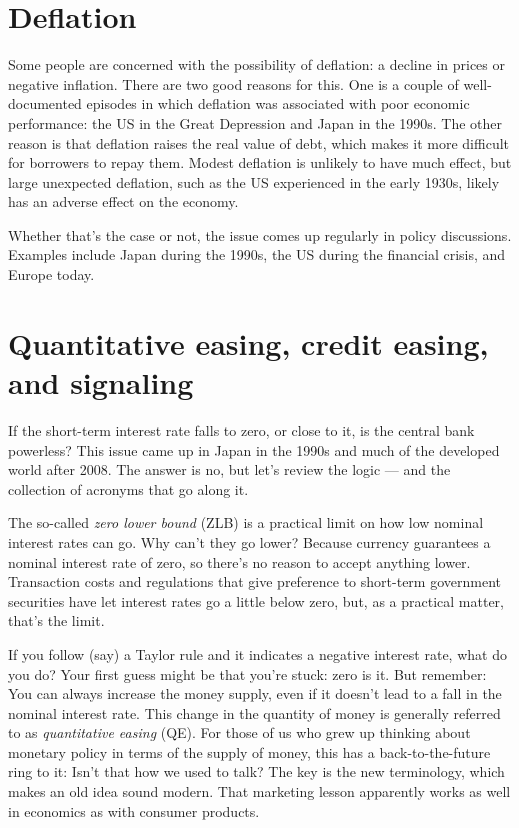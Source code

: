 \section{Deflation}

Some people are concerned with the possibility of deflation:
a decline in prices or negative inflation.
There are two good reasons for this.
One is a couple of well-documented episodes in which deflation was associated
with poor economic performance:
the US in the Great Depression and Japan in the 1990s.
The other reason is that deflation raises the real value of debt,
which makes it more difficult for borrowers to repay them.
Modest deflation is unlikely to have much effect,
but large unexpected deflation, such as the US experienced in the early 1930s,
likely has an adverse effect on the economy.

Whether that's the case or not, the issue comes up regularly in policy discussions.
Examples include Japan during the 1990s, the US during the financial crisis,
and Europe today.


\section{Quantitative easing, credit easing, and signaling}

If the short-term interest rate falls to zero, or close to it,
is the central bank  powerless?
This issue came up in Japan in the 1990s and
much of the developed world after 2008.
The answer is no, but let's review the logic --- and the collection of acronyms that go along it.

The so-called {\it zero lower bound\/} (ZLB) is a practical
limit on how low nominal interest rates can go.
Why can't they go lower?
Because currency guarantees a nominal interest rate of zero,
so there's no reason to accept anything lower.
Transaction costs and regulations that give preference
to short-term government securities have let interest rates
go a little below zero, but, as a practical matter, that's the limit.

If you follow (say) a Taylor rule and it indicates a negative interest rate,
what do you do?
Your first guess might be that you're stuck:  zero is it.
But remember:  You can always increase the money supply,
even if it doesn't lead to a fall in the nominal interest rate.
This change in the quantity of money is generally referred to as
{\it   quantitative easing \/} (QE).
For those of us who grew up thinking about monetary policy in
terms of the supply of money,
this has a back-to-the-future ring to it:
Isn't that how we used to talk?
The key is the new terminology,
which makes an old idea sound modern.
That marketing lesson apparently works as well in economics
as with consumer products.

